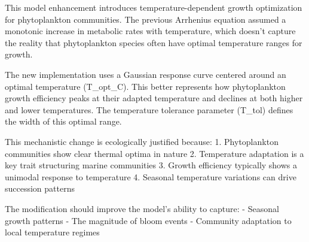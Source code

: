 This model enhancement introduces temperature-dependent growth optimization for phytoplankton communities. The previous Arrhenius equation assumed a monotonic increase in metabolic rates with temperature, which doesn't capture the reality that phytoplankton species often have optimal temperature ranges for growth.

The new implementation uses a Gaussian response curve centered around an optimal temperature (T_opt_C). This better represents how phytoplankton growth efficiency peaks at their adapted temperature and declines at both higher and lower temperatures. The temperature tolerance parameter (T_tol) defines the width of this optimal range.

This mechanistic change is ecologically justified because:
1. Phytoplankton communities show clear thermal optima in nature
2. Temperature adaptation is a key trait structuring marine communities
3. Growth efficiency typically shows a unimodal response to temperature
4. Seasonal temperature variations can drive succession patterns

The modification should improve the model's ability to capture:
- Seasonal growth patterns
- The magnitude of bloom events
- Community adaptation to local temperature regimes
